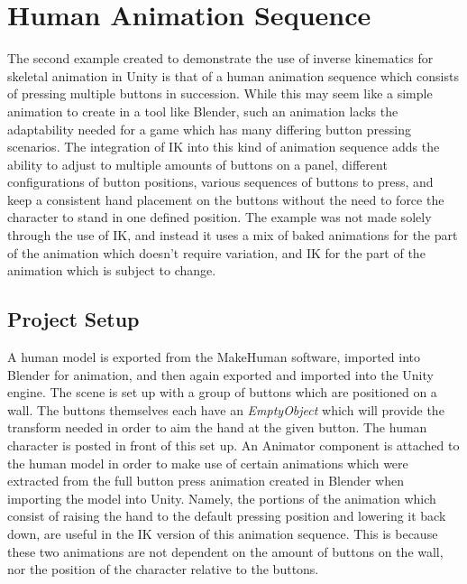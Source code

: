 \section{Human Animation Sequence}
The second example created to demonstrate the use of inverse kinematics for
skeletal animation in Unity is that of a human animation sequence which consists
of pressing multiple buttons in succession. While this may seem like a simple
animation to create in a tool like Blender, such an animation lacks the
adaptability needed for a game which has many differing button pressing
scenarios. The integration of IK into this kind of animation sequence adds the
ability to adjust to multiple amounts of buttons on a panel, different
configurations of button positions, various sequences of buttons to press, and
keep a consistent hand placement on the buttons without the need to force the
character to stand in one defined position. The example was not made solely
through the use of IK, and instead it uses a mix of baked animations for the
part of the animation which doesn't require variation, and IK for the part of
the animation which is subject to change.

\subsection{Project Setup}
A human model is exported from the MakeHuman software, imported into Blender for
animation, and then again exported and imported into the Unity engine. The scene
is set up with a group of buttons which are positioned on a wall. The buttons
themselves each have an \textit{EmptyObject} which will provide the transform
needed in order to aim the hand at the given button. The human character is
posted in front of this set up. An Animator component is attached to the human
model in order to make use of certain animations which were extracted from the
full button press animation created in Blender when importing the model into
Unity. Namely, the portions of the animation which consist of raising the hand
to the default pressing position and lowering it back down, are useful in the IK
version of this animation sequence. This is because these two animations are not
dependent on the amount of buttons on the wall, nor the position of the
character relative to the buttons.
